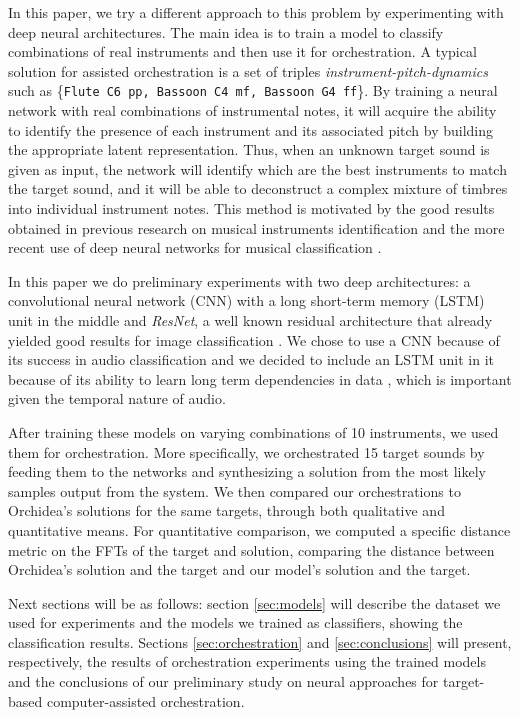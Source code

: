 \documentclass[runningheads,a4paper]{llncs}
\begin{document}
In this paper, we try a different approach to this problem by experimenting with deep neural architectures. The main idea is to train a model to classify combinations of real instruments and then use it for orchestration. A typical solution for assisted orchestration is a set of triples \emph{instrument-pitch-dynamics} such as \{\texttt{Flute C6 pp, Bassoon C4 mf, Bassoon G4 ff}\}. By training a neural network with real combinations of instrumental notes, it will acquire the ability to identify the presence of each instrument and its associated pitch by building the appropriate latent representation. Thus, when an unknown target sound is given as input, the network will identify which are the best instruments to match the target sound, and it will be able to  deconstruct a complex mixture of timbres into individual instrument notes. This method is motivated by the good results obtained in previous research on musical instruments identification \cite{Benetos07, Kitahara05} and the more recent use of deep neural networks for musical classification \cite{lostanlen16, Bian19}.

In this paper we do preliminary experiments with two deep architectures: a convolutional neural network (CNN) with a long short-term memory (LSTM) unit in the middle and \emph{ResNet}, a well known residual architecture that already yielded good results for image classification \cite{He15}. We chose to use a CNN because of its success in audio classification \cite{Hershey17} and we decided to include an LSTM unit in it because of its ability to learn long term dependencies in data \cite{Hochreiter97}, which is important given the temporal nature of audio.

After training these models on varying combinations of 10 instruments, we used them for orchestration. More specifically, we orchestrated 15 target sounds by feeding them to the networks and synthesizing a solution from the most likely samples output from the system. We then compared our orchestrations to Orchidea's solutions for the same targets, through both qualitative and quantitative means. For quantitative comparison, we computed a specific distance metric on the FFTs of the target and solution, comparing the distance between Orchidea's solution and the target and our model's solution and the target.

Next sections will be as follows: section \ref{sec:models} will describe the dataset we used for experiments and the models we trained as classifiers, showing the classification results. Sections \ref{sec:orchestration} and \ref{sec:conclusions} will present, respectively, the results of orchestration experiments using the trained models and the conclusions of our preliminary study on neural approaches for target-based computer-assisted orchestration.
\end{document}
